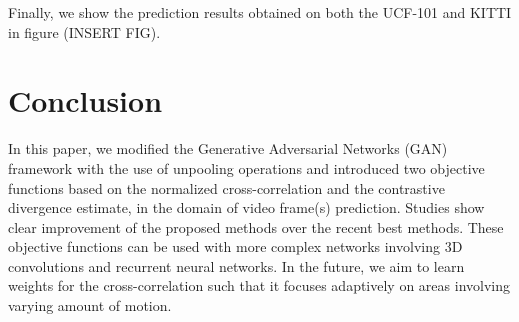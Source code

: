 \documentclass{article}
\begin{document}
   Finally, we show the prediction results obtained on both the UCF-101 and KITTI in figure (INSERT FIG).
   
\section{Conclusion}
  \label{sec:conclusion}
  In this paper, we modified the Generative Adversarial Networks (GAN) framework with the use of unpooling operations and introduced two objective functions based on the normalized cross-correlation and the contrastive divergence estimate, in the domain of video frame(s) prediction. Studies show clear improvement of the proposed methods over the recent best methods. These objective functions can be used with more complex networks involving 3D convolutions and recurrent neural networks. In the future, we aim to learn weights for the cross-correlation such that it focuses adaptively on areas involving varying amount of motion.  
{\small
	
	
}
\end{document}
